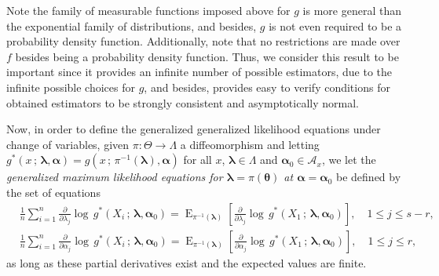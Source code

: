 \documentclass[lineno]{biometrika}
\newcommand{\bs}{\boldsymbol}
\newcommand{\on}{\operatorname}
\begin{document}
Note the family of measurable functions imposed above for $g$ is more general than the exponential family of distributions, and besides, $g$ is not even required to be a probability density function.
 Additionally, note that no restrictions are made over $f$ besides being a probability density function. Thus, we consider this result to be important since it provides an infinite number of possible estimators, due to the infinite possible choices for $g$, and besides, provides easy to verify conditions for obtained estimators to be strongly consistent and asymptotically normal.

Now, in order to define the generalized generalized likelihood equations under change of variables, given $\pi:\Theta\to \Lambda$ a diffeomorphism and letting $g^*(x\,;\, \bs{\lambda},\bs{\alpha})=g(x\,;\, \pi^{-1}(\bs{\lambda}),\bs{\alpha})$ for all $x$, $\bs{\lambda}\in \Lambda$ and $\bs{\alpha}_0\in \mathcal{A}_x$, we let the \textit{generalized maximum likelihood equations for $\bs{\lambda}=\pi(\bs{\theta})$ at $\bs{\alpha}=\bs{\alpha}_0$} be defined by the set of equations
\begin{equation}\label{modified2}
\begin{aligned}
&\frac{1}{n}\sum_{i=1}^n \frac{\partial}{\partial \lambda_j}  \log\, g^*(X_i\,;\,\bs{\lambda},\bs{\alpha}_0) = \on{E}_{\pi^{-1}(\bs{\lambda})}\left[\frac{\partial}{\partial \lambda_j}  \log\, g^*(X_1\,;\,\bs{\lambda},\bs{\alpha}_0)\right],\quad 1\leq j\leq s-r,\\ &\frac{1}{n}
\sum_{i=1}^n \frac{\partial}{\partial \alpha_j}  \log\, g^*(X_i\,;\,\bs{\lambda},\bs{\alpha}_0)=\on{E}_{\pi^{-1}(\bs{\lambda})}\left[\frac{\partial}{\partial \alpha_j}  \log\, g^*(X_1\,;\,\bs{\lambda},\bs{\alpha}_0)\right], \quad  1\leq j\leq r,
\end{aligned}
\end{equation}
as long as these partial derivatives exist and the expected values are finite.
\end{document}
